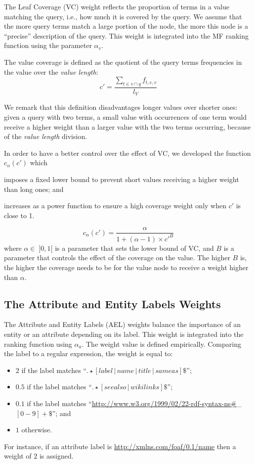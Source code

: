 The Leaf Coverage (VC) weight reflects the proportion of terms in a value matching the query, i.e., how much it is covered by the query. We assume that the more query terms match a large portion of the node, the more this node is a ``precise'' description of the query. This weight is integrated into the MF ranking function using the parameter $\alpha_v$.

The value coverage is defined as the quotient of the query terms frequencies in the value over the \emph{value length}: %
$$
c' = \frac{\sum_{t\in v \cap q}{f_{t,e,v}}}{l_V}
$$

We remark that this definition disadvantages longer values over shorter ones: given a query with two terms, a small value with occurrences of one term would receive a higher weight than a larger value with the two terms occurring, because of the \emph{value length} division.

In order to have a better control over the effect of VC, we developed the function $c_\alpha(c')$ which
\begin{inparaenum}[(1)]
  \item imposes a fixed lower bound to prevent short values receiving a higher weight than long ones; and
  \item increases as a power function to ensure a high coverage weight only when $c'$ is close to 1.
\end{inparaenum}
\begin{equation}
\label{eq:vc-norm}
c_\alpha(c') = \frac{\alpha}{1+(\alpha-1)\times c'^B}
\end{equation}
where $\alpha \in \; ]0,1[$ is a parameter that sets the lower bound of VC, and $B$ is a parameter that controls the effect of the coverage on the value. The higher $B$ is, the higher the coverage needs to be for the value node to receive a weight higher than $\alpha$.

\subsection{The Attribute and Entity Labels Weights}
\label{sec:att-subj-w}

The Attribute and Entity Labels (AEL) weights balance the importance of an entity or an attribute depending on its label. This weight is integrated into the ranking function using $\alpha_a$.
The weight value is defined empirically. Comparing the label to a regular expression, the weight is equal to:

\begin{itemize}
    \item $2$ if the label matches ``$.\star[label\,\vert\,name\,\vert\,title\,\vert\,sameas]\$$'';
    \item $0.5$ if the label matches ``$.\star[seealso\,\vert\,wikilinks]\$$'';
    \item $0.1$ if the label matches ``\url{http://www.w3.org/1999/02/22-rdf-syntax-ns\#}\_$[0-9]+\$$''; and
    \label{it:rdf:bag}
    \item $1$ otherwise.
\end{itemize}
For instance, if an attribute label is \url{http://xmlns.com/foaf/0.1/name} then a weight of $2$ is assigned.

